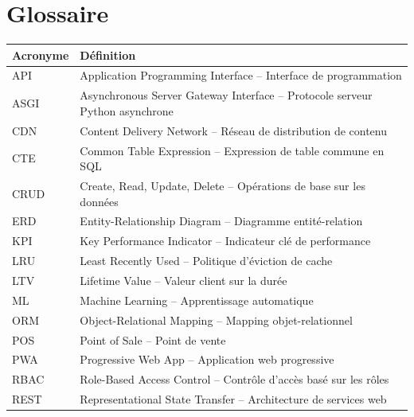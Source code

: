 \documentclass[12pt,a4paper,openany]{report}
\begin{document}
\newpage

\listoffigures
{}

\newpage

\chapter*{Glossaire}

\begin{longtable}{lp{11cm}}
\toprule
\textbf{Acronyme} & \textbf{Définition} \\
\midrule
\endhead
API & Application Programming Interface -- Interface de programmation \\
ASGI & Asynchronous Server Gateway Interface -- Protocole serveur Python asynchrone \\
CDN & Content Delivery Network -- Réseau de distribution de contenu \\
CTE & Common Table Expression -- Expression de table commune en SQL \\
CRUD & Create, Read, Update, Delete -- Opérations de base sur les données \\
ERD & Entity-Relationship Diagram -- Diagramme entité-relation \\
KPI & Key Performance Indicator -- Indicateur clé de performance \\
LRU & Least Recently Used -- Politique d'éviction de cache \\
LTV & Lifetime Value -- Valeur client sur la durée \\
ML & Machine Learning -- Apprentissage automatique \\
ORM & Object-Relational Mapping -- Mapping objet-relationnel \\
POS & Point of Sale -- Point de vente \\
PWA & Progressive Web App -- Application web progressive \\
RBAC & Role-Based Access Control -- Contrôle d'accès basé sur les rôles \\
REST & Representational State Transfer -- Architecture de services web \\

\end{longtable}
\end{document}
